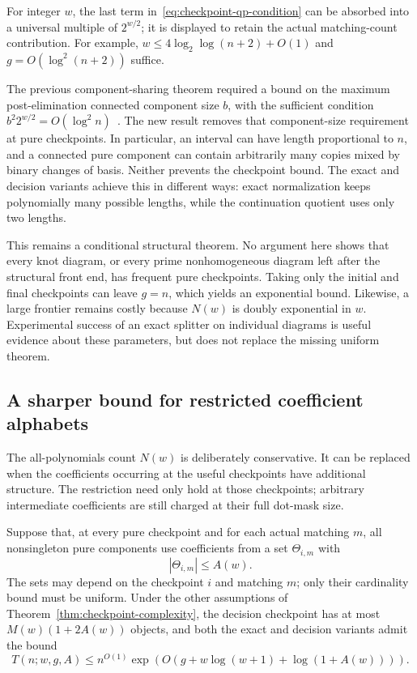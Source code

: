 For integer $w$, the last term in~\eqref{eq:checkpoint-qp-condition}
can be absorbed into a universal multiple of $2^{w/2}$; it is displayed
to retain the actual matching-count contribution. For example,
$w\le4\log_2\log(n+2)+O(1)$ and $g=O(\log^2(n+2))$ suffice.

The previous component-sharing theorem required a bound on the maximum
post-elimination connected component size $b$, with the sufficient
condition $b^2 2^{w/2}=O(\log^2 n)$~\cite{prior}. The new result removes
that component-size requirement at pure checkpoints. In particular,
an interval can have length proportional to $n$, and a connected pure
component can contain arbitrarily many copies mixed by binary changes
of basis. Neither prevents the checkpoint bound. The exact and decision
variants achieve this in different ways: exact normalization keeps
polynomially many possible lengths, while the continuation quotient
uses only two lengths.

This remains a conditional structural theorem. No argument here shows
that every knot diagram, or every prime nonhomogeneous diagram left
after the structural front end, has frequent pure checkpoints. Taking
only the initial and final checkpoints can leave $g=n$, which yields
an exponential bound. Likewise, a large frontier remains costly because
$N(w)$ is doubly exponential in $w$. Experimental success of an exact
splitter on individual diagrams is useful evidence about these
parameters, but does not replace the missing uniform theorem.

\subsection{A sharper bound for restricted coefficient alphabets}
\label{sec:coefficient-alphabets}

The all-polynomials count $N(w)$ is deliberately conservative. It can be
replaced when the coefficients occurring at the useful checkpoints have
additional structure. The restriction need only hold at those
checkpoints; arbitrary intermediate coefficients are still charged at
their full dot-mask size.

\begin{corollary}
\label{cor:coefficient-alphabet}
Suppose that, at every pure checkpoint and for each actual matching $m$,
all nonsingleton pure components use coefficients from a set
$\Theta_{i,m}$ with
\[
 |\Theta_{i,m}|\le A(w).
\]
The sets may depend on the checkpoint $i$ and matching $m$; only their
cardinality bound must be uniform. Under the other assumptions of
Theorem~\ref{thm:checkpoint-complexity}, the decision checkpoint has at
most $M(w)(1+2A(w))$ objects, and both the exact and decision variants
admit the bound
\begin{equation}\label{eq:alphabet-runtime}
 T(n;w,g,A)\le n^{O(1)}
 \exp\!\left(O\!\left(g+w\log(w+1)+\log(1+A(w))\right)\right).
\end{equation}
\end{corollary}

